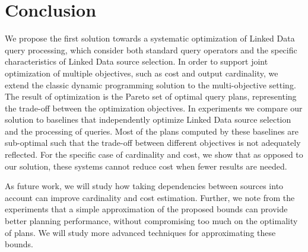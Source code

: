 \section{Conclusion}
\label{sec:conclusion}

We propose the first solution towards a systematic optimization of
Linked Data query processing, which consider both standard query operators
and the specific characteristics of Linked Data source selection. In order to support joint optimization of multiple objectives, such as cost and output cardinality,
we extend the classic dynamic programming solution to the multi-objective setting. The result of optimization is the Pareto set of optimal query plans, representing the trade-off between the
optimization objectives. 
In experiments we compare our
solution to baselines that independently optimize Linked Data source selection and the processing of queries. Most of the plans computed by these baselines are sub-optimal such that the trade-off between different objectives is not adequately reflected. For the specific case of cardinality and cost, we show that as opposed to our solution, these systems cannot reduce cost when fewer results are needed. 

As future work, we will study how taking dependencies between sources into account can improve cardinality and
cost estimation. Further, we note from the experiments that a simple approximation of the proposed bounds can provide better planning performance, without compromising too much on the optimality of plans. We will study more advanced techniques for approximating these bounds. 

